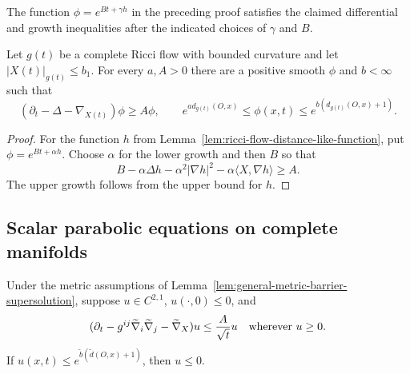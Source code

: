 \begin{example}
\label{ex:construct-general-metric-barrier}
The function $\phi=e^{Bt+\gamma h}$ in the preceding proof satisfies the
claimed differential and growth inequalities after the indicated choices of
$\gamma$ and $B$.
\end{example}

\begin{lemma}
\label{lem:ricci-flow-barrier-supersolution}
Let $g(t)$ be a complete Ricci flow with bounded curvature and let
$|X(t)|_{g(t)}\leq b_1$.  For every $a,A>0$ there are a positive smooth
$\phi$ and $b<\infty$ such that
\[
(\partial_t-\Delta-\nabla_{X(t)})\phi\geq A\phi,
\qquad
e^{a d_{g(t)}(O,x)}\leq\phi(x,t)\leq
e^{b(d_{g(t)}(O,x)+1)}.
\]
\end{lemma}

\begin{proof}
For the function $h$ from Lemma~\ref{lem:ricci-flow-distance-like-function},
put $\phi=e^{Bt+\alpha h}$.  Choose $\alpha$ for the lower growth and then
$B$ so that
\[
B-\alpha\Delta h-\alpha^2|\nabla h|^2-
\alpha\langle X,\nabla h\rangle\geq A.
\]
The upper growth follows from the upper bound for $h$.
\end{proof}

\subsection{Scalar parabolic equations on complete manifolds}

\begin{theorem}
\label{thm:complete-manifold-scalar-wmp-barrier}
Under the metric assumptions of Lemma~\ref{lem:general-metric-barrier-supersolution},
suppose $u\in C^{2,1}$, $u(\cdot,0)\leq0$, and
\[
(\partial_t-g^{ij}\widetilde\nabla_i\widetilde\nabla_j
-\widetilde\nabla_X)u\leq \frac A{\sqrt t}u
\quad\hbox{wherever }u\geq0.
\]
If $u(x,t)\leq e^{\widetilde b(\widetilde d(O,x)+1)}$, then $u\leq0$.
\end{theorem}

